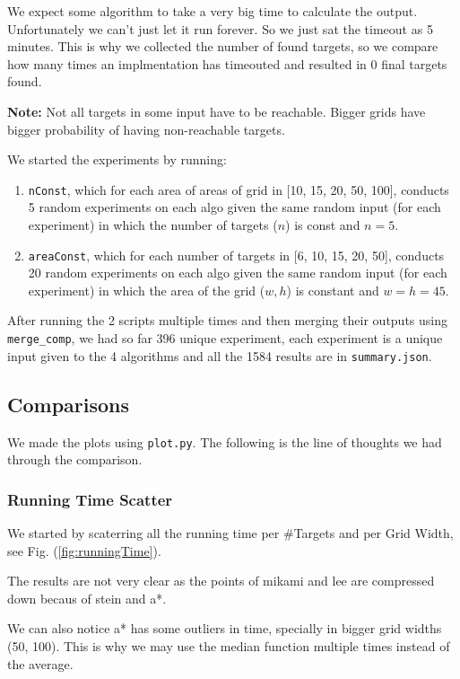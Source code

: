 We expect some algorithm to take a very big time to calculate the output. Unfortunately we can't just let it run forever. So we just sat the timeout as 5 minutes. This is why we collected the number of found targets, so we compare how many times an implmentation has timeouted and resulted in 0 final targets found.

\textbf{Note:} Not all targets in some input have to be reachable. Bigger grids have bigger probability of having non-reachable targets.

We started the experiments by running:
\begin{enumerate}
    \item \texttt{nConst}, which for each area of areas of grid in [10, 15, 20, 50, 100], conducts 5 random experiments on each algo given the same random input (for each experiment) in which the number of targets ($n$) is const and $n = 5$.
    \item \texttt{areaConst}, which for each number of targets in [6, 10, 15, 20, 50], conducts 20 random experiments on each algo given the same random input (for each experiment) in which the area of the grid ($w,h$) is constant and $w = h = 45$.
\end{enumerate}

After running the 2 scripts multiple times and then merging their outputs using \texttt{merge\_comp}, we had so far 396 unique experiment, each experiment is a unique input given to the 4 algorithms and all the 1584 results are in \texttt{summary.json}.

\subsection{Comparisons}
We made the plots using \texttt{plot.py}. The following is the line of thoughts we had through the comparison.

\subsubsection{Running Time Scatter}
We started by scaterring all the running time per \#Targets and per Grid Width, see Fig. (\ref{fig:runningTime}). 

The results are not very clear as the points of mikami and lee are compressed down becaus of stein and a*. 

We can also notice a* has some outliers in time, specially in bigger grid widths (50, 100). This is why we may use the median function multiple times instead of the average.

